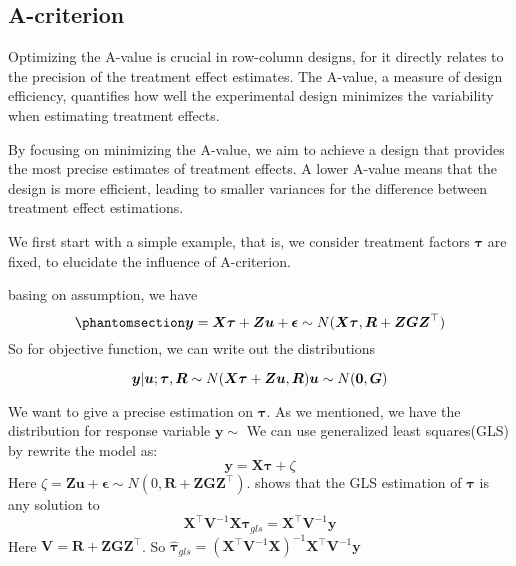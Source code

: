\documentclass[
  a4paper,
  oneside,
  openany,
  12pt,
  onecolumn]{book}
\theoremstyle{plain}
\theoremstyle{definition}
\theoremstyle{remark}
\begin{document}
\subsection{A-criterion}\label{a-criterion}

Optimizing the A-value is crucial in row-column designs, for it directly
relates to the precision of the treatment effect estimates. The A-value,
a measure of design efficiency, quantifies how well the experimental
design minimizes the variability when estimating treatment effects.

By focusing on minimizing the A-value, we aim to achieve a design that
provides the most precise estimates of treatment effects. A lower
A-value means that the design is more efficient, leading to smaller
variances for the difference between treatment effect estimations.

We first start with a simple example, that is, we consider treatment
factors \(\boldsymbol{\tau}\) are fixed, to elucidate the influence of
A-criterion.

basing on assumption, we have
\begin{equation}\phantomsection\label{eq-asp}{
\boldsymbol{y}=\boldsymbol{X}\boldsymbol{\tau}+\boldsymbol{Z}\boldsymbol{u}+\boldsymbol{\epsilon}\sim N(\boldsymbol{X}\boldsymbol{\tau},\boldsymbol{R}+\boldsymbol{ZGZ}^\top)
}\end{equation} So for objective function, we can write out the
distributions

\[
\boldsymbol{y}|\boldsymbol{u};\boldsymbol{\tau},\boldsymbol{R}\sim N(\boldsymbol{X}\boldsymbol{\tau}+\boldsymbol{Z}\boldsymbol{u},\boldsymbol{R}) \\
\boldsymbol{u}\sim N(\boldsymbol{0},\boldsymbol{G})
\]

We want to give a precise estimation on \(\boldsymbol{\tau}\). As we
mentioned, we have the distribution for response variable
\(\boldsymbol{y}\sim\) We can use generalized least squares(GLS) by
rewrite the model as: \[
\boldsymbol{y} = \boldsymbol{X}\boldsymbol{\tau} + \zeta
\] Here
\(\zeta = \boldsymbol{Z}\boldsymbol{u}+\boldsymbol{\epsilon}\sim N(0, \boldsymbol{R}+\boldsymbol{Z}\boldsymbol{G}\boldsymbol{Z}^\top)\).
\citet{henderson1975best} shows that the GLS estimation of
\(\boldsymbol{\tau}\) is any solution to \[
\boldsymbol{X}^\top\boldsymbol{V}^{-1}\boldsymbol{X}\hat{\boldsymbol{\tau}}_{gls}=\boldsymbol{X}^\top\boldsymbol{V}^{-1}\boldsymbol{y}
\] Here
\(\boldsymbol{V}=\boldsymbol{R}+\boldsymbol{Z}\boldsymbol{G}\boldsymbol{Z}^\top\).
So
\(\hat{\boldsymbol{\tau}}_{gls} = (\boldsymbol{X}^\top\boldsymbol{V}^{-1}\boldsymbol{X})^{-1}\boldsymbol{X}^\top\boldsymbol{V}^{-1}\boldsymbol{y}\)
\end{document}
